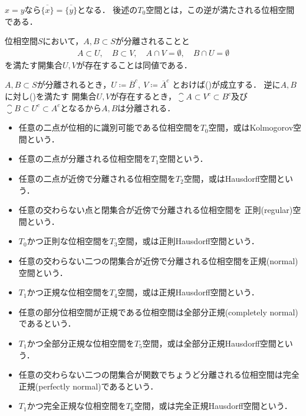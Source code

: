 	\begin{prf}
		$x = y$なら$\overline{\{x\}} = \overline{\{y\}}$となる．
		後述の$T_0$空間とは，この逆が満たされる位相空間である．
		\QED
	\end{prf}
	
	\begin{screen}
		\begin{thm}[分離される集合は他方を含まない近傍を持つ]
		\label{thm:the_equivalent_condition_of_separatedness}
			位相空間$S$において，$A,B \subset S$が分離されることと
			\begin{align}
				A \subset U,\quad B \subset V,\quad 
				A \cap V = \emptyset,
				\quad B \cap U = \emptyset
				\label{eq:thm_the_equivalent_condition_of_separatedness}
			\end{align}
			を満たす開集合$U,V$が存在することは同値である．
		\end{thm}
	\end{screen}
	
	\begin{prf}
		$A,B \subset S$が分離されるとき，$U \coloneqq \overline{B}^c,\ V \coloneqq \overline{A}^c$
		とおけば()が成立する．
		逆に$A,B$に対し()を満たす
		開集合$U,V$が存在するとき，$\closure{A} \subset V^c \subset B^c$及び
		$\closure{B} \subset U^c \subset A^c$となるから$A,B$は分離される．
		\QED
	\end{prf}
	
	\begin{screen}
		\begin{dfn}[分離公理]\mbox{}
			\begin{itemize}
				\item 任意の二点が位相的に識別可能である位相空間を$T_0$空間，或はKolmogorov空間という．
				\item 任意の二点が分離される位相空間を$T_1$空間という．
				\item 任意の二点が近傍で分離される位相空間を$T_2$空間，或はHausdorff空間という．
				\item 任意の交わらない点と閉集合が近傍で分離される位相空間を
					正則(regular)空間という．
				\item $T_0$かつ正則な位相空間を$T_3$空間，或は正則Hausdorff空間という．
				\item 任意の交わらない二つの閉集合が近傍で分離される位相空間を正規(normal)空間という．
				\item $T_1$かつ正規な位相空間を$T_4$空間，或は正規Hausdorff空間という．
				\item 任意の部分位相空間が正規である位相空間は全部分正規(completely normal)であるという．
				\item $T_1$かつ全部分正規な位相空間を$T_5$空間，或は全部分正規Hausdorff空間という．
				\item 任意の交わらない二つの閉集合が関数でちょうど分離される位相空間は完全正規(perfectly normal)であるという．
				\item $T_1$かつ完全正規な位相空間を$T_6$空間，或は完全正規Hausdorff空間という．
			\end{itemize}
		\end{dfn}
	\end{screen}
	

